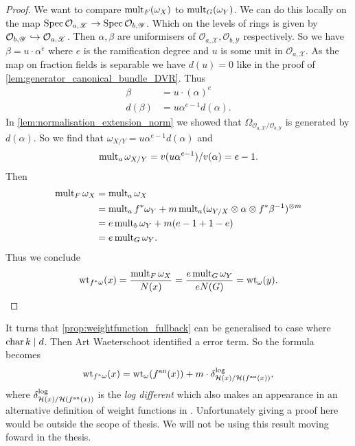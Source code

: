 \begin{proof}
	We want to compare $\operatorname{mult}_{F}(\omega_X)$ to $\operatorname{mult}_{G}(\omega_Y)$. 
	We can do this locally on the map $\operatorname{Spec} \mathcal{O}_{a, \mathscr X} \to \operatorname{Spec} \mathcal{O}_{b, \mathscr Y}$.
	Which on the levels of rings is given by $ \mathcal{O}_{b, \mathscr Y}\hookrightarrow  \mathcal{O}_{a, \mathscr X}$.
	Then $\alpha, \beta$ are uniformisers of $\mathcal{O}_{a, \mathscr X}, \mathcal{O}_{b, \mathscr Y}$ respectively. 
	So we have $\beta = u\cdot \alpha ^{e}$ where $e$ is the ramification degree and $u$ is some unit in $\mathcal{O}_{a, \mathscr X}$. 
	As the map on fraction fields is separable we have $d(u) = 0$ like in the proof of \cref{lem:generator_canonical_bundle_DVR}. 
	Thus
	\begin{align*}
		\beta &= u \cdot (\alpha)^e \\
		d(\beta) &= u \alpha^{e-1} d(\alpha)
	.\end{align*}
	In \cref{lem:normalisation_extension_norm} we showed that $\Omega_{\mathcal{O}_{a, \mathscr X} / \mathcal{O}_{b, \mathscr Y}}$ is generated by $d(\alpha)$. 
	So we find that $\omega_{X / Y} = u \alpha ^{e-1} d(\alpha)$ and \[
		\operatorname{mult}_{a} \omega_{X / Y} = v(u \alpha ^{e-1}) / v(\alpha) = e-1
	.\] 
	Then  
	\begin{align*}
		\operatorname{mult}_{F} \omega_X &= \operatorname{mult}_{a} \omega _X\\
				   &=  \operatorname{mult}_{a} f^*\omega_Y +  m \operatorname{mult}_{a} (\omega_{Y / X} \otimes \alpha \otimes f^*\beta ^{-1})^{\otimes m} \\
				   &= e \operatorname{mult}_b \omega_Y + m(e-1 + 1 -e) \\
				   &= e\operatorname{mult}_{G}\omega_Y 
	.\end{align*} 
	Thus we conclude 
	 \[
		 \operatorname{wt}_{f^* \omega}(x) = \frac{\operatorname{mult}_{F} \omega_X}{N(x)} = \frac{e\operatorname{mult}_G \omega_Y}{eN(G)} = \operatorname{wt}_{\omega}(y)
	.\] 
\end{proof}

\begin{remark}\label{rem:weightfunction_fullback_art} 
	It turns that \cref{prop:weightfunction_fullback} can be generalised to case where $\operatorname{char} k \mid d$. 
	Then Art Waeterschoot identified a error term. 
	So the formula becomes \[
		\operatorname{wt}_{f^* \omega}(x) = \operatorname{wt}_{\omega}(f{}^{\text{an}} (x)) + m \cdot \delta_{\mathcal{H} (x) / \mathcal{H} (f{}^{\text{an}}(x))}^{\text{log}}
	,\] 
	where $\delta_{\mathcal{H} (x) / \mathcal{H} (f{}^{\text{an}}(x))}^{\text{log}}$ is the \emph{log different} which also makes an appearance in an alternative definition of weight functions in \cite{temkinMetrizationDifferentialPluriforms2016a}.
	Unfortunately giving a proof here would be outside the scope of thesis.
	We will not be using this result moving foward in the thesis. 
\end{remark}


